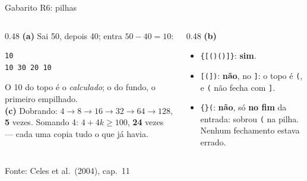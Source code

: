 \documentclass[aspectratio=169]{beamer}
\newcommand{\fonte}[1]{\vfill\hfill{\scriptsize\textcolor{UFSGray}{Fonte: #1}}}
\begin{document}
\begin{frame}[fragile]{Gabarito R6: pilhas}
  \begin{columns}[T]
    \begin{column}{0.48\textwidth}
      \small
      \textbf{(a)} Sai 50, depois 40; entra $50 - 40 = 10$:
\begin{lstlisting}[style=shellStyle]
10
10 30 20 10
\end{lstlisting}
      O 10 do topo é o \emph{calculado}; o do fundo, o primeiro
      empilhado.\\[0.4em]
      \textbf{(c)} Dobrando: $4 \to 8 \to 16 \to 32 \to 64 \to 128$,
      \textbf{5} vezes. Somando 4: $4 + 4k \ge 100$, \textbf{24} vezes ---
      cada uma copia tudo o que já havia.
    \end{column}
    \begin{column}{0.48\textwidth}
      \small
      \textbf{(b)}
      \begin{itemize}
        \item \texttt{\{[()()]\}}: \textbf{sim}.
        \item \texttt{[(])}: \textbf{não}, no \texttt{]}: o topo é
          \texttt{(}, e \texttt{(} não fecha com \texttt{]}.
        \item \texttt{\{\}(}: \textbf{não}, só \textbf{no fim} da entrada:
          sobrou \texttt{(} na pilha. Nenhum fechamento estava errado.
      \end{itemize}
    \end{column}
  \end{columns}
  \fonte{Celes et al.\ (2004), cap.~11~\cite{celes2004introducao}}
\end{frame}
\end{document}
